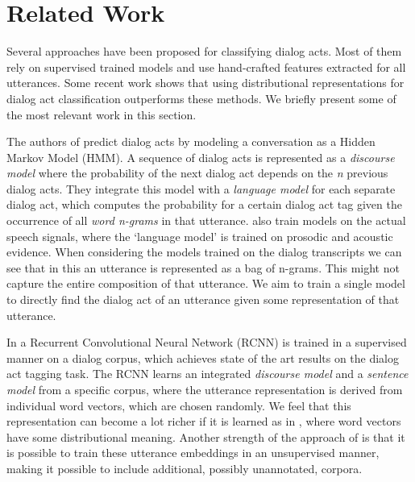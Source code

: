 \section{Related Work}\label{sec:relwork}
Several approaches have been proposed for classifying dialog acts. Most of them rely on supervised trained models and use hand-crafted features extracted for all utterances. Some recent work shows that using distributional representations for dialog act classification outperforms these methods. We briefly present some of the most relevant work in this section.

The authors of  predict dialog acts by modeling a conversation as a Hidden Markov Model (HMM). A sequence of dialog acts is represented as a \emph{discourse model} where the probability of the next dialog act depends on the \emph{n} previous dialog acts. They integrate this model with a \emph{language model} for each separate dialog act, which computes the probability for a certain dialog act tag given the occurrence of all \emph{word n-grams} in that utterance.  also train models on the actual speech signals, where the `language model' is trained on prosodic and acoustic evidence. When considering the models trained on the dialog transcripts we can see that in this an utterance is represented as a bag of n-grams. This might not capture the entire composition of that utterance. We aim to train a single model to directly find the dialog act of an utterance given some representation of that utterance.

In  a Recurrent Convolutional Neural Network (RCNN) is trained in a supervised manner on a dialog corpus, which achieves state of the art results on the dialog act tagging task. The RCNN learns an integrated \emph{discourse model} and a \emph{sentence model} from a specific corpus, where the utterance representation is derived from individual word vectors, which are chosen randomly. We feel that this representation can become a lot richer if it is learned as in , where word vectors have some distributional meaning. Another strength of the approach of  is that it is possible to train these utterance embeddings in an unsupervised manner, making it possible to include additional, possibly unannotated, corpora. 

